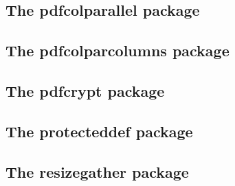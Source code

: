 \documentclass[a4paper,12pt]{article}
\makeatletter
\providecommand*{\pdfTeX}{pdf\TeX}
\providecommand*{\VTeX}{V\TeX}
\newcommand*{\xpackage}[1]{\textsf{#1}}
\newcommand*{\cs}[1]{\texttt{\textbackslash#1}}
\newcommand*{\tocinclude}[1]{%
  \setcounter{tocdepth}{3}%
  \begingroup
    \makeatletter
    \def\@prj{#1}%
    \let\contentsline\foreign@contentsline
  \endgroup
}
\def\foreign@contentsline#1#2#3#4{%
  \ifx\\#4\\%
    \csname l@#1\endcsname{#2}{#3}%
  \else
    \ifHy@linktocpage
      \csname l@#1\endcsname{{#2}}{%
        \hyper@linkfile{#3}{\@prj.pdf}{#4}%
      }%
    \else
      \csname l@#1\endcsname{%
        \hyper@linkfile{#2}{\@prj.pdf}{#4}%
      }{#3}%
    \fi
  \fi
}%
\newcommand*{\pkgsectformat}[1]{%
  \texorpdfstring{%
    \textcolor{link}{The} %
    \xpackage{#1} %
    \textcolor{link}{package}%
  }{#1}%
}
\makeatother
\begin{document}
\newpage
\subsection{\pkgsectformat{pdfcolparallel}}
\label{pdfcolparallel}
\begin{abstract}
This packages fixes bugs in \xpackage{parallel} and
improves color support by using several color stacks
that are provided by \pdfTeX\ since version 1.40.
\end{abstract}
\tocinclude{pdfcolparallel}

\newpage
\subsection{\pkgsectformat{pdfcolparcolumns}}
\label{pdfcolparcolumns}
\begin{abstract}
Since version 1.40 \pdfTeX\ supports several color stacks.
This package uses them to fix color problems in
package \xpackage{parcolumns}.
\end{abstract}
\tocinclude{pdfcolparcolumns}

\newpage
\subsection{\pkgsectformat{pdfcrypt}}
\label{pdfcrypt}
\begin{abstract}
This package supports the setting of pdf encryption options
for \VTeX\ and some older versions of \pdfTeX.
\end{abstract}
\tocinclude{pdfcrypt}

\newpage
\subsection{\pkgsectformat{protecteddef}}
\label{protecteddef}
\begin{abstract}
This packages provides \cs{ProtectedDef} for defining
robust macros for both  and .
First 's \cs{protected} is tried, then
's \cs{DeclareRobustCommand} is used.
Otherwise the macro is not made robust.
\end{abstract}
\tocinclude{protecteddef}

\newpage
\subsection{\pkgsectformat{resizegather}}
\label{resizegather}
\begin{abstract}
Equations that are too large are resized to fit the available
space. The environment \textsf{gather} of package \xpackage{amsmath}
is supported. Also the environments \textsf{equation} and
\textsf{displaymath} are redefined using \textsf{gather}
and its starred version.
\end{abstract}
\tocinclude{resizegather}
\end{document}
